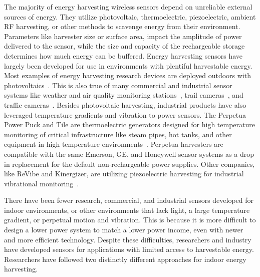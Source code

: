 The majority of energy harvesting wireless sensors depend on unreliable external sources of energy. 
They utilize photovoltaic, thermoelectric, piezoelectric, ambient RF harvesting, or other methods to scavenge energy from their environment. 
Parameters like harvester size or surface area, impact the amplitude of power delivered to the sensor, 
while the size and capacity of the rechargeable storage determines how much energy can be buffered. 
Energy harvesting sensors
have largely been developed for use in environments with plentiful harvestable energy.
Most examples of energy harvesting research devices are deployed outdoors with photovoltaics~\cite{jiang2005perpetual, kansal2007power, corke2007long, lin2005heliomote, taneja2008design, adkins2018signpost}.
This is also true of many commercial and industrial sensor systems like weather and air quality monitoring stations~\cite{davis_weather}, trail cameras~\cite{spypoint_camera}, and traffic cameras~\cite{wanco_traffic}.
Besides photovoltaic harvesting, industrial products have also leveraged temperature gradients and vibration to power sensors. The Perpetua Power Puck and Tile are thermoelectric generators designed for high temperature monitoring of critical infrastructure like steam pipes, hot tanks, and other equipment in high temperature environments~\cite{perpetua}.
Perpetua harvesters are compatible with the same Emerson, GE, and Honeywell sensor systems as a drop in replacement for the default non-rechargeable power supplies. Other companies, like ReVibe and Kinergizer, are utilizing piezoelectric harvesting for industrial vibrational monitoring~\cite{revibe,kinergizer}.

There have been fewer research, commercial, and industrial sensors developed for indoor environments, or other environments that lack light, a large temperature gradient, or perpetual motion and vibration.
This is because it is more difficult to design a lower power system to match a lower power income, even with newer and more efficient technology.
Despite these difficulties, researchers and industry have developed sensors for applications with limited access to harvestable energy.
Researchers have followed two distinctly different approaches for indoor energy harvesting.


